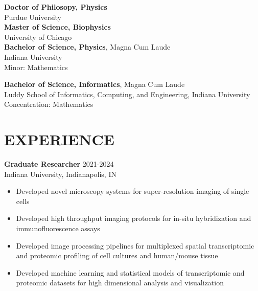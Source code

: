 \documentclass[margin, 10pt]{res} %
\begin{document}
\begin{resume}
\textbf{Doctor of Philosopy, Physics}\\
Purdue University\\

\textbf{Master of Science, Biophysics}\\
University of Chicago\\


\textbf{Bachelor of Science, Physics}, Magna Cum Laude\\
Indiana University\\
Minor: Mathematics 

\textbf{Bachelor of Science, Informatics}, Magna Cum Laude\\
Luddy School of Informatics, Computing, and Engineering, Indiana University\\
Concentration: Mathematics 
  
 
\section{EXPERIENCE}

\textbf{Graduate Researcher} \hfill 2021-2024 \\
Indiana University, Indianapolis, IN

\begin{itemize} \itemsep -2pt %

\item Developed novel microscopy systems for super-resolution imaging of single cells 

\item Developed high throughput imaging protocols for in-situ hybridization and immunofluorescence assays

\item Developed image processing pipelines for multiplexed spatial transcriptomic and proteomic profiling of cell cultures and human/mouse tissue

\item Developed machine learning and statistical models of transcriptomic and proteomic datasets for high dimensional analysis and visualization



\end{itemize}
\end{resume}
\end{document}
